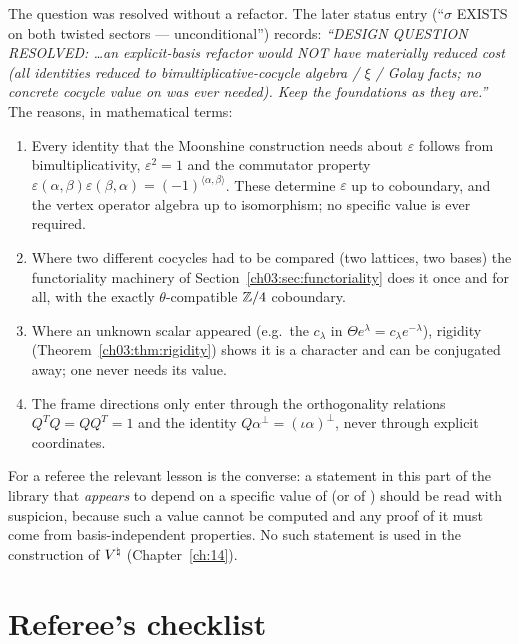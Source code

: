 The question was resolved without a refactor. The later status entry (``$\sigma$ EXISTS on both
twisted sectors --- unconditional'') records: \emph{``DESIGN QUESTION RESOLVED: \ldots an
explicit-basis refactor would NOT have materially reduced cost (all identities reduced to
bimultiplicative-cocycle algebra / $\xi$ / Golay facts; no concrete cocycle value on
 was ever needed). Keep the foundations as they are.''} The reasons, in
mathematical terms:
\begin{enumerate}
\item Every identity that the Moonshine construction needs about $\varepsilon$ follows from
  bimultiplicativity, $\varepsilon^2=1$ and the commutator property
  $\varepsilon(\alpha,\beta)\varepsilon(\beta,\alpha)=(-1)^{\langle\alpha,\beta\rangle}$. These
  determine $\varepsilon$ up to coboundary, and the vertex operator algebra up to isomorphism; no
  specific value is ever required.
\item Where two different cocycles had to be compared (two lattices, two bases) the functoriality
  machinery of Section~\ref{ch03:sec:functoriality} does it once and for all, with the exactly
  $\theta$-compatible ${\mathbb{Z}}/4$ coboundary.
\item Where an unknown scalar appeared (e.g.\ the $c_\lambda$ in $\Theta e^\lambda=c_\lambda
  e^{-\lambda}$), rigidity (Theorem~\ref{ch03:thm:rigidity}) shows it is a character and can be
  conjugated away; one never needs its value.
\item The frame directions only enter through the orthogonality relations $Q^TQ=QQ^T=1$ and the
  identity $Q\alpha^\perp=(\iota\alpha)^\perp$, never through explicit coordinates.
\end{enumerate}

\begin{warning}
For a referee the relevant lesson is the converse: a statement in this part of the library that
\emph{appears} to depend on a specific value of  (or of )
should be read with suspicion, because such a value cannot be computed and any proof of it must
come from basis-independent properties. No such statement is used in the construction of
${V^{\natural}}$ (Chapter~\ref{ch:14}).
\end{warning}

\section{Referee's checklist}\label{ch03:sec:checklist}

